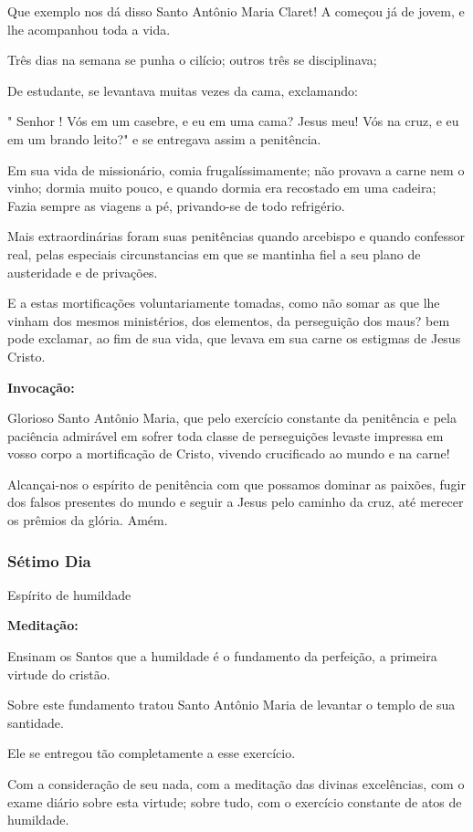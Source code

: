 \documentclass[a4paper,14pt]{extarticle} \usepackage[utf8]{inputenc}
\begin{document}
Que exemplo nos dá disso Santo Antônio Maria Claret! A começou já de jovem, e lhe acompanhou toda a vida.

Três dias na semana se punha o cilício; outros três se disciplinava;

De estudante, se levantava muitas vezes da cama, exclamando:

" Senhor ! Vós em um casebre, e eu em uma cama? Jesus meu! Vós na cruz, e eu em um brando leito?" e se entregava assim a penitência.

Em sua vida de missionário, comia frugalíssimamente; não provava a carne nem o vinho; dormia muito pouco, e quando dormia era recostado em uma cadeira; Fazia sempre as viagens a pé, privando-se de todo refrigério.

Mais extraordinárias foram suas penitências quando arcebispo e quando confessor real, pelas especiais circunstancias em que se mantinha fiel a seu plano de austeridade e de privações.

E a estas mortificações voluntariamente tomadas, como não somar as que lhe vinham dos mesmos ministérios, dos elementos, da perseguição dos maus? bem pode exclamar, ao fim de sua vida, que levava em sua carne os estigmas de Jesus Cristo.

\textbf{Invocação:}

Glorioso Santo Antônio Maria, que pelo exercício constante da penitência e pela paciência admirável em sofrer toda classe de perseguições levaste impressa em vosso corpo a mortificação de Cristo, vivendo crucificado ao mundo e na carne!

Alcançai-nos o espírito de penitência com que possamos dominar as paixões, fugir dos falsos presentes do mundo e seguir a Jesus pelo caminho da cruz, até merecer os prêmios da glória. Amém.

\subsubsection{Sétimo Dia}
Espírito de humildade

\textbf{Meditação:}

Ensinam os Santos que a humildade é o fundamento da perfeição, a primeira virtude do cristão.

Sobre este fundamento tratou Santo Antônio Maria de levantar o templo de sua santidade.

Ele se entregou tão completamente a esse exercício.

Com a consideração de seu nada, com a meditação das divinas excelências, com o exame diário sobre esta virtude; sobre tudo, com o exercício constante de atos de humildade.
\end{document}
